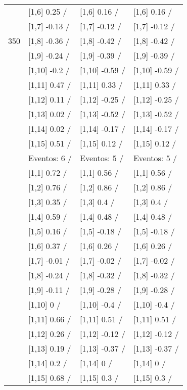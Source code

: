 \begin{table}
\begin{tabular}[t]{llll}
 & {}[1,6] 0.25  / & {}[1,6] 0.16  / & {}[1,6] 0.16  /\\
 & {}[1,7] -0.13  / & {}[1,7] -0.12  / & {}[1,7] -0.12  /\\
350 & {}[1,8] -0.36  / & {}[1,8] -0.42  / & {}[1,8] -0.42  /\\
\addlinespace
 & {}[1,9] -0.24  / & {}[1,9] -0.39  / & {}[1,9] -0.39  /\\
 & {}[1,10] -0.2  / & {}[1,10] -0.59  / & {}[1,10] -0.59  /\\
 & {}[1,11] 0.47  / & {}[1,11] 0.33  / & {}[1,11] 0.33  /\\
 & {}[1,12] 0.11  / & {}[1,12] -0.25  / & {}[1,12] -0.25  /\\
 & {}[1,13] 0.02  / & {}[1,13] -0.52  / & {}[1,13] -0.52  /\\
\addlinespace
 & {}[1,14] 0.02  / & {}[1,14] -0.17  / & {}[1,14] -0.17  /\\
 & {}[1,15] 0.51  / & {}[1,15] 0.12  / & {}[1,15] 0.12  /\\
 & Eventos:  6 / & Eventos:  5 / & Eventos:  5 /\\
 & {}[1,1] 0.72  / & {}[1,1] 0.56  / & {}[1,1] 0.56  /\\
 & {}[1,2] 0.76  / & {}[1,2] 0.86  / & {}[1,2] 0.86  /\\
\addlinespace
 & {}[1,3] 0.35  / & {}[1,3] 0.4  / & {}[1,3] 0.4  /\\
 & {}[1,4] 0.59  / & {}[1,4] 0.48  / & {}[1,4] 0.48  /\\
 & {}[1,5] 0.16  / & {}[1,5] -0.18  / & {}[1,5] -0.18  /\\
 & {}[1,6] 0.37  / & {}[1,6] 0.26  / & {}[1,6] 0.26  /\\
 & {}[1,7] -0.01  / & {}[1,7] -0.02  / & {}[1,7] -0.02  /\\
\addlinespace
500 & {}[1,8] -0.24  / & {}[1,8] -0.32  / & {}[1,8] -0.32  /\\
 & {}[1,9] -0.11  / & {}[1,9] -0.28  / & {}[1,9] -0.28  /\\
 & {}[1,10] 0  / & {}[1,10] -0.4  / & {}[1,10] -0.4  /\\
 & {}[1,11] 0.66  / & {}[1,11] 0.51  / & {}[1,11] 0.51  /\\
 & {}[1,12] 0.26  / & {}[1,12] -0.12  / & {}[1,12] -0.12  /\\
\addlinespace
 & {}[1,13] 0.19  / & {}[1,13] -0.37  / & {}[1,13] -0.37  /\\
 & {}[1,14] 0.2  / & {}[1,14] 0  / & {}[1,14] 0  /\\
 & {}[1,15] 0.68  / & {}[1,15] 0.3  / & {}[1,15] 0.3  /\\
\bottomrule
\end{tabular}
\end{table}
